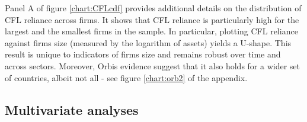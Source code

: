 \documentclass[12pt]{article}
\begin{document}
\noindent Panel A of figure \ref{chart:CFLcdf} provides additional details on the distribution of CFL reliance across firms. It shows that CFL reliance is particularly high for the largest and the smallest firms in the sample. In particular, plotting CFL reliance against firms size (measured by the logarithm of assets) yields a U-shape. This result is unique to indicators of firms size and remains robust over time and across sectors. Moreover, Orbis evidence suggest that it also holds for a wider set of countries, albeit not all - see figure \ref{chart:orb2} of the appendix. 

\subsection{Multivariate analyses \label{sec: multivariate analysis}}
\end{document}
